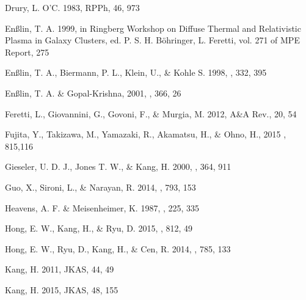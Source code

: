 \documentclass[twocolumn]{aastex61}
\begin{document}
\begin{thebibliography}{}
Drury, L. O'C. 1983,
RPPh, 46, 973

En{\ss}lin, T. A. 1999, in Ringberg Workshop on Diffuse Thermal
and Relativistic Plasma in Galaxy Clusters, ed. P. S. H.
B\"ohringer, L. Feretti, vol. 271 of MPE Report, 275

En{\ss}lin, T. A., Biermann, P. L., Klein, U., \& Kohle S. 1998,
\aap, 332, 395

En{\ss}lin, T. A. \& Gopal-Krishna, 2001,
\aap, 366, 26

Feretti, L., Giovannini, G., Govoni, F., \& Murgia, M. 2012,
A\&A Rev., 20, 54

Fujita, Y., Takizawa, M., Yamazaki, R., Akamatsu, H., \& Ohno, H., 2015
\apj, 815,116

Gieseler, U. D. J., Jones T. W., \& Kang, H. 2000, \aap, 364, 911

Guo, X., Sironi, L., \& Narayan, R. 2014,
\apj, 793, 153

Heavens, A. F. \& Meisenheimer, K. 1987, \mnras, 225, 335

Hong, E. W., Kang, H., \& Ryu, D. 2015,
\apj, 812, 49

Hong, E. W., Ryu, D., Kang, H., \& Cen, R. 2014,
\apj, 785, 133

Kang, H. 2011,
JKAS, 44, 49

Kang, H. 2015,
JKAS, 48, 155


\end{thebibliography}
\end{document}

